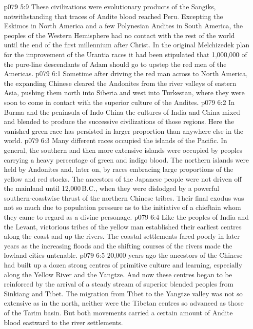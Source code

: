 \vs p079 5:9 These civilizations were evolutionary products of the Sangiks, notwithstanding that traces of Andite blood reached Peru. Excepting the Eskimos in North America and a few Polynesian Andites in South America, the peoples of the Western Hemisphere had no contact with the rest of the world until the end of the first millennium after Christ. In the original Melchizedek plan for the improvement of the Urantia races it had been stipulated that 1,000,000 of the pure\hyp{}line descendants of Adam should go to upstep the red men of the Americas.
\vs p079 6:1 Sometime after driving the red man across to North America, the expanding Chinese cleared the Andonites from the river valleys of eastern Asia, pushing them north into Siberia and west into Turkestan, where they were soon to come in contact with the superior culture of the Andites.
\vs p079 6:2 In Burma and the peninsula of Indo\hyp{}China the cultures of India and China mixed and blended to produce the successive civilizations of those regions. Here the vanished green race has persisted in larger proportion than anywhere else in the world.
\vs p079 6:3 Many different races occupied the islands of the Pacific. In general, the southern and then more extensive islands were occupied by peoples carrying a heavy percentage of green and indigo blood. The northern islands were held by Andonites and, later on, by races embracing large proportions of the yellow and red stocks. The ancestors of the Japanese people were not driven off the mainland until 12,000\,B.C., when they were dislodged by a powerful southern\hyp{}coastwise thrust of the northern Chinese tribes. Their final exodus was not so much due to population pressure as to the initiative of a chieftain whom they came to regard as a divine personage.
\vs p079 6:4 Like the peoples of India and the Levant, victorious tribes of the yellow man established their earliest centres along the coast and up the rivers. The coastal settlements fared poorly in later years as the increasing floods and the shifting courses of the rivers made the lowland cities untenable.
\vs p079 6:5 20,000 years ago the ancestors of the Chinese had built up a dozen strong centres of primitive culture and learning, especially along the Yellow River and the Yangtze. And now these centres began to be reinforced by the arrival of a steady stream of superior blended peoples from Sinkiang and Tibet. The migration from Tibet to the Yangtze valley was not so extensive as in the north, neither were the Tibetan centres so advanced as those of the Tarim basin. But both movements carried a certain amount of Andite blood eastward to the river settlements.
